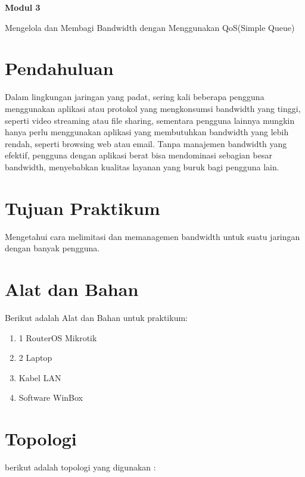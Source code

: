 \newpage
\setcounter{section}{0}
\renewcommand{\thesection}{\arabic{section}}

\begin{center}
    \Huge
    \textbf{Modul 3}
    
    Mengelola dan Membagi Bandwidth dengan Menggunakan QoS(Simple Queue) 

\end{center}


\section{Pendahuluan}

Dalam lingkungan jaringan yang padat, sering kali beberapa pengguna menggunakan aplikasi atau protokol yang mengkonsumsi bandwidth yang tinggi, seperti video streaming atau file sharing, sementara pengguna lainnya mungkin hanya perlu menggunakan aplikasi yang membutuhkan bandwidth yang lebih rendah, seperti browsing web atau email. Tanpa manajemen bandwidth yang efektif, pengguna dengan aplikasi berat bisa mendominasi sebagian besar bandwidth, menyebabkan kualitas layanan yang buruk bagi pengguna lain.

\section{Tujuan Praktikum}

Mengetahui cara melimitasi dan memanagemen bandwidth untuk suatu jaringan dengan banyak pengguna.

\section{Alat dan Bahan}

Berikut adalah Alat dan Bahan untuk praktikum:
\begin{enumerate}
    \item 1 RouterOS Mikrotik
    \item 2 Laptop
    \item Kabel LAN 
    \item Software WinBox
\end{enumerate}

\section{Topologi}

berikut adalah topologi yang digunakan :


